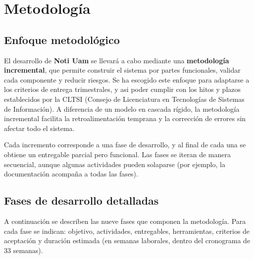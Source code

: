 \section{Metodología}

\subsection{Enfoque metodológico}

El desarrollo de \textbf{Noti Uam} se llevará a cabo mediante una \textbf{metodología incremental}, que permite construir el sistema por partes funcionales, validar cada componente y reducir riesgos. Se ha escogido este enfoque para adaptarse a los criterios de entrega trimestrales, y asi poder cumplir con los hitos y plazos establecidos por la CLTSI (Consejo de Licenciatura en Tecnologías de Sistemas de Información). A diferencia de un modelo en cascada rígido, la metodología incremental facilita la retroalimentación temprana y la corrección de errores sin afectar todo el sistema.

Cada incremento corresponde a una fase de desarrollo, y al final de cada una se obtiene un entregable parcial pero funcional. Las fases se iteran de manera secuencial, aunque algunas actividades pueden solaparse (por ejemplo, la documentación acompaña a todas las fases).

\subsection{Fases de desarrollo detalladas}

A continuación se describen las nueve fases que componen la metodología. Para cada fase se indican: objetivo, actividades, entregables, herramientas, criterios de aceptación y duración estimada (en semanas laborales, dentro del cronograma de 33 semanas).

